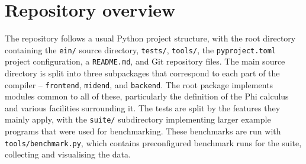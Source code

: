 \section{Repository overview}

The repository follows a usual Python project structure, with the root directory containing the \texttt{ein/} source directory, \texttt{tests/}, \texttt{tools/}, the \texttt{pyproject.toml} project configuration, a \texttt{README.md}, and Git repository files. The main source directory is split into three subpackages that correspond to each part of the compiler -- \texttt{frontend}, \texttt{midend}, and \texttt{backend}. The root package implements modules common to all of these, particularly the definition of the Phi calculus and various facilities surrounding it. The tests are split by the features they mainly apply, with the \texttt{suite/} subdirectory implementing larger example programs that were used for benchmarking. These benchmarks are run with \texttt{tools/benchmark.py}, which contains preconfigured benchmark runs for the suite, collecting and visualising the data.

